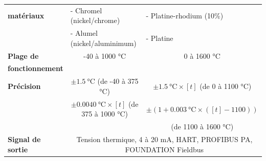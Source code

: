 \documentclass{article}
\begin{document}
\begin{table}[H]
\begin{tabular}{l|c|c}
            \textbf{matériaux}          & \multicolumn{1}{l|}{ - Chromel (nickel/chrome)}    & \multicolumn{1}{l}{ - Platine-rhodium (10\%)}\\
                                        & \multicolumn{1}{l|}{ - Alumel (nickel/aluminimum)} & \multicolumn{1}{l}{ - Platine}\\
            \hline
            \textbf{Plage de}           & -40 à 1000 \si{\celsius}      & 0 à 1600 \si{\celsius}        \\
            \textbf{fonctionnement}     &                               &                               \\
            \hline
            \textbf{Précision}          & $\pm \SI{1.5}{\celsius}$ (de -40 à 375 \si{\celsius})
                                            & $\pm \SI{1.5}{\celsius} \times \left[t\right]$ (de 0 à 1100 \si{\celsius})\\
                                        & $\pm \SI{0.0040}{\celsius} \times \left[t\right]$ (de 375 à 1000 \si{\celsius})
                                            & $\pm \left(1 + \SI{0.003}{\celsius} \times \left( \left[t\right] - 1100\right)\right)$\\
                                        & & (de 1100 à 1600 \si{\celsius})\\
            
            \hline
            \textbf{Signal de sortie}   & \multicolumn{2}{c}{Tension thermique, 4 à 20 mA, HART, PROFIBUS PA, FOUNDATION Fieldbus}\\
        \end{tabular}
        \end{table}
        
\end{document}
